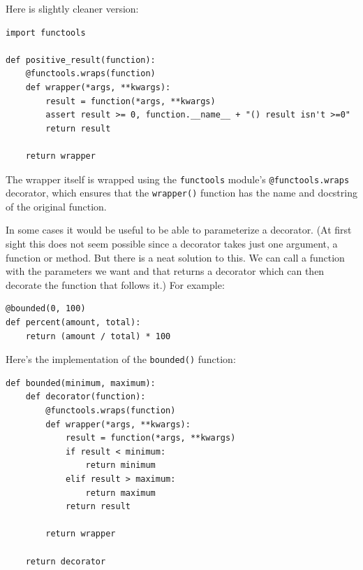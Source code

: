 Here is slightly cleaner version:
\begin{lstlisting}
import functools
  
def positive_result(function):
    @functools.wraps(function)
    def wrapper(*args, **kwargs):
        result = function(*args, **kwargs)
        assert result >= 0, function.__name__ + "() result isn't >=0"
        return result

    return wrapper  
\end{lstlisting}

The wrapper itself is wrapped using the \verb|functools| module's \verb|@functools.wraps| decorator,
which ensures that the \verb|wrapper()| function has the name and docstring of the original function.


In some cases it would be useful to be able to parameterize a decorator.
(At first sight this does not seem possible since a decorator takes just one argument, a function or method.
But there is a neat solution to this.
We can call a function with the parameters we want and that returns a decorator
which can then decorate the function that follows it.)
For example:
\begin{lstlisting}
@bounded(0, 100)
def percent(amount, total):
    return (amount / total) * 100  
\end{lstlisting}

Here's the implementation of the \verb|bounded()| function:
\begin{lstlisting}
def bounded(minimum, maximum):
    def decorator(function):
        @functools.wraps(function)
        def wrapper(*args, **kwargs):
            result = function(*args, **kwargs)
            if result < minimum:
                return minimum
            elif result > maximum:
                return maximum
            return result

        return wrapper

    return decorator  
\end{lstlisting}


